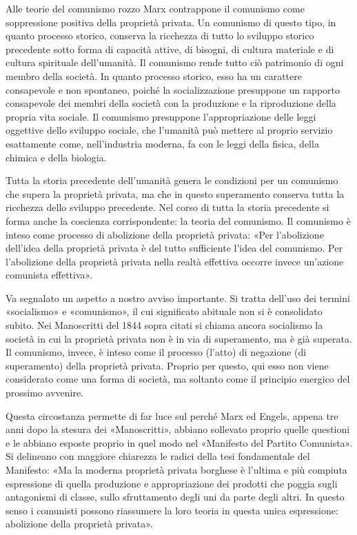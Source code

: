\documentclass[../main]{subfiles}
\begin{document}
Alle teorie del comunismo rozzo Marx contrappone il comunismo come soppressione positiva della proprietà privata. Un comunismo di questo tipo, in quanto processo storico, conserva la ricchezza di tutto lo sviluppo storico precedente sotto forma di capacità attive, di bisogni, di cultura materiale e di cultura spirituale dell'umanità. Il comunismo rende tutto ciò patrimonio di ogni membro della società. In quanto processo storico, esso ha un carattere consapevole e non spontaneo, poiché la socializzazione presuppone un rapporto consapevole dei membri della società con la produzione e la riproduzione della propria vita sociale. Il comunismo presuppone l'appropriazione delle leggi oggettive dello sviluppo sociale, che l'umanità può mettere al proprio servizio esattamente come, nell'industria moderna, fa con le leggi della fisica, della chimica e della biologia.

Tutta la storia precedente dell'umanità genera le condizioni per un comunismo che supera la proprietà privata, ma che in questo superamento conserva tutta la ricchezza dello sviluppo precedente. Nel corso di tutta la storia precedente si forma anche la coscienza corrispondente: la teoria del comunismo. Il comunismo è inteso come processo di abolizione della proprietà privata: «Per l'abolizione dell'idea della proprietà privata è del tutto sufficiente l'idea del comunismo. Per l'abolizione della proprietà privata nella realtà effettiva occorre invece un'azione comunista effettiva».

Va segnalato un aspetto a nostro avviso importante. Si tratta dell'uso dei termini «socialismo» e «comunismo», il cui significato abituale non si è consolidato subito. Nei Manoscritti del 1844 sopra citati si chiama ancora socialismo la società in cui la proprietà privata non è in via di superamento, ma è già superata. Il comunismo, invece, è inteso come il processo (l'atto) di negazione (di superamento) della proprietà privata. Proprio per questo, qui esso non viene considerato come una forma di società, ma soltanto come il principio energico del prossimo avvenire.

Questa circostanza permette di far luce sul perché Marx ed Engels, appena tre anni dopo la stesura dei «Manoscritti», abbiano sollevato proprio quelle questioni e le abbiano esposte proprio in quel modo nel «Manifesto del Partito Comunista». Si delineano con maggiore chiarezza le radici della tesi fondamentale del Manifesto: «Ma la moderna proprietà privata borghese è l'ultima e più compiuta espressione di quella produzione e appropriazione dei prodotti che poggia sugli antagonismi di classe, sullo sfruttamento degli uni da parte degli altri. In questo senso i comunisti possono riassumere la loro teoria in questa unica espressione: abolizione della proprietà privata».
\end{document}
